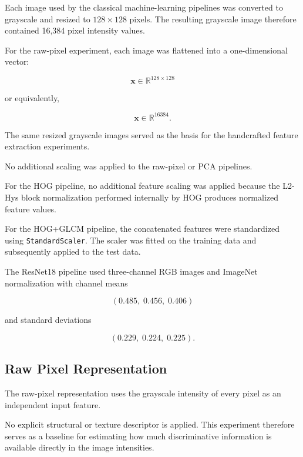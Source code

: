 \documentclass[11pt,a4paper]{article}
\begin{document}
Each image used by the classical machine-learning pipelines was converted to grayscale and resized to $128 \times 128$ pixels. The resulting grayscale image therefore contained 16,384 pixel intensity values.

For the raw-pixel experiment, each image was flattened into a one-dimensional vector:

\begin{equation}
\mathbf{x} \in \mathbb{R}^{128 \times 128}
\end{equation}

or equivalently,

\begin{equation}
\mathbf{x} \in \mathbb{R}^{16384}.
\end{equation}

The same resized grayscale images served as the basis for the handcrafted feature extraction experiments.

No additional scaling was applied to the raw-pixel or PCA pipelines.

For the HOG pipeline, no additional feature scaling was applied because the L2-Hys block normalization performed internally by HOG produces normalized feature values.

For the HOG+GLCM pipeline, the concatenated features were standardized using \texttt{StandardScaler}. The scaler was fitted on the training data and subsequently applied to the test data.

The ResNet18 pipeline used three-channel RGB images and ImageNet normalization with channel means

\begin{equation}
(0.485,\;0.456,\;0.406)
\end{equation}

and standard deviations

\begin{equation}
(0.229,\;0.224,\;0.225).
\end{equation}

\subsection{Raw Pixel Representation}

The raw-pixel representation uses the grayscale intensity of every pixel as an independent input feature.

No explicit structural or texture descriptor is applied. This experiment therefore serves as a baseline for estimating how much discriminative information is available directly in the image intensities.
\end{document}
